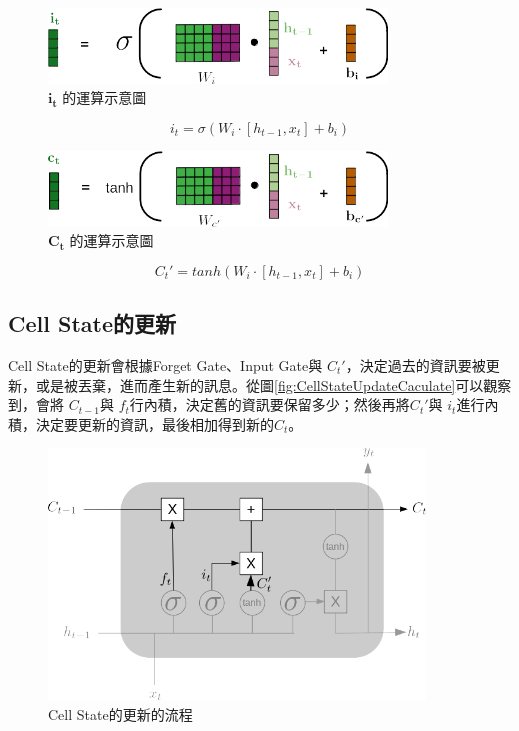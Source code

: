 \begin{figure}[H]
	\centering
	\includegraphics[width=9cm]{./pic/P11XgmjT.png}
	\caption{\(\mathbf{i_t}\) 的運算示意圖}
	\label{fig:InputGateCaculate}
\end{figure}

\begin{equation}
	\label{eqn:InputGateCalculate}
	i_t = \sigma(W_i\cdot[h_{t-1},x_t]+b_i)
\end{equation}

\begin{figure}[H]
	\centering
	\includegraphics[width=9cm]{./pic/EI5hsLBg.png}
	\caption{\(\mathbf{C_t}\) 的運算示意圖}
	\label{fig:InputCalculate}
\end{figure}


\begin{equation}
	\label{eqn:InputCalculate}
	C_t' = tanh(W_i\cdot[h_{t-1},x_t]+b_i)
\end{equation}

\subsection{Cell State的更新}

Cell State的更新會根據Forget Gate、Input Gate與 \(C_t'\)，決定過去的資訊要被更新，或是被丟棄，進而產生新的訊息。從圖\ref{fig:CellStateUpdateCaculate}可以觀察到，會將 \(C_{t-1}\)與 \(f_t\)行內積，決定舊的資訊要保留多少；然後再將\(C_t'\)與 \(i_t\)進行內積，決定要更新的資訊，最後相加得到新的\(C_t\)。

\begin{figure}[H]
	\centering
	\includegraphics[width=10cm]{./pic/rQqms2xi.png}
	\caption{Cell State的更新的流程}
	\label{fig:CellStateUpdate}
\end{figure}


